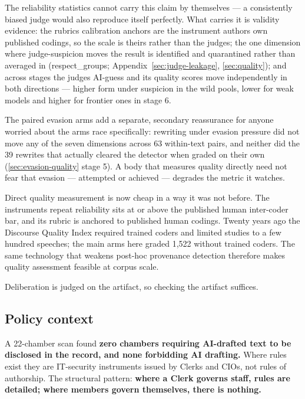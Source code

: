 The reliability statistics cannot carry this claim by themselves --- a consistently biased judge would also reproduce itself perfectly. What carries it is validity evidence: the rubric\textquotesingle s calibration anchors are the instrument authors\textquotesingle{} own published codings, so the scale is theirs rather than the judge\textquotesingle s; the one dimension where judge-suspicion moves the result is identified and quarantined rather than averaged in (respect\_groups; Appendix~\ref{sec:judge-leakage}, \cref{sec:quality}); and across stages the judge\textquotesingle s AI-guess and its quality scores move independently in both directions --- higher form under suspicion in the wild pools, lower for weak models and higher for frontier ones in stage 6.

The paired evasion arms add a separate, secondary reassurance for anyone worried about the arms race specifically: rewriting under evasion pressure did not move any of the seven dimensions across 63 within-text pairs, and neither did the 39 rewrites that actually cleared the detector when graded on their own (\cref{sec:evasion-quality} stage 5). A body that measures quality directly need not fear that evasion --- attempted or achieved --- degrades the metric it watches.

Direct quality measurement is now cheap in a way it was not before. The
instrument\textquotesingle s repeat reliability sits at or above the published human
inter-coder bar, and its rubric is anchored to published human codings.
Twenty years ago the Discourse Quality Index required trained coders and
limited studies to a few hundred speeches; the main arms here graded 1,522
without trained coders. The same technology that weakens post-hoc provenance
detection therefore makes quality assessment feasible at corpus scale.

Deliberation is judged on the artifact, so checking the artifact suffices.

\subsection{Policy context}\label{sec:policy}

A 22-chamber scan found \textbf{zero chambers requiring AI-drafted text to be
disclosed in the record, and none forbidding AI drafting.} Where rules
exist they are IT-security instruments issued by Clerks and CIOs, not rules
of authorship. The structural pattern: \textbf{where a Clerk governs staff, rules
are detailed; where members govern themselves, there is nothing.}

